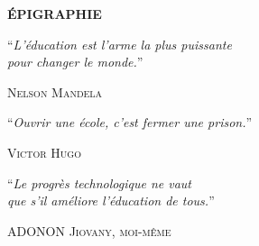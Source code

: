 \thispagestyle{empty}

\vspace*{2cm}

\begin{center}
\Large \textbf{ÉPIGRAPHIE}
\end{center}

\vspace{1cm}

\begin{center}
\epigraph{\enquote{\textit{L'éducation est l'arme la plus puissante\\[3pt]
pour changer le monde.}}}{\textsc{Nelson Mandela}}

\vspace{1.5cm}

\epigraph{\enquote{\textit{Ouvrir une école, c'est fermer une prison.}}}{\textsc{Victor Hugo}}

\vspace{1.5cm}

\epigraph{\enquote{\textit{Le progrès technologique ne vaut\\[3pt]
que s'il améliore l'éducation de tous.}}}{\textsc{ADONON Jiovany, moi-même}}
\end{center}

\vfill

